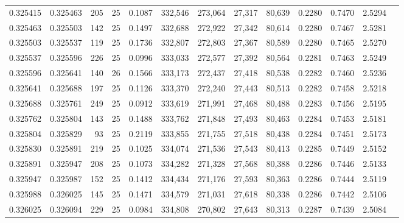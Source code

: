 \begin{tabular}{rrrrrrrrrrrrr}
0.325415 & 0.325463 &   205 &  25 &                                     0.1087 & 332,546 & 273,064 &  27,317 &  80,639 & 0.2280 & 0.7470 & 2.5294 \\
0.325463 & 0.325503 &   142 &  25 &                                     0.1497 & 332,688 & 272,922 &  27,342 &  80,614 & 0.2280 & 0.7467 & 2.5281 \\
0.325503 & 0.325537 &   119 &  25 &                                     0.1736 & 332,807 & 272,803 &  27,367 &  80,589 & 0.2280 & 0.7465 & 2.5270 \\
0.325537 & 0.325596 &   226 &  25 &                                     0.0996 & 333,033 & 272,577 &  27,392 &  80,564 & 0.2281 & 0.7463 & 2.5249 \\
0.325596 & 0.325641 &   140 &  26 &                                     0.1566 & 333,173 & 272,437 &  27,418 &  80,538 & 0.2282 & 0.7460 & 2.5236 \\
0.325641 & 0.325688 &   197 &  25 &                                     0.1126 & 333,370 & 272,240 &  27,443 &  80,513 & 0.2282 & 0.7458 & 2.5218 \\
0.325688 & 0.325761 &   249 &  25 &                                     0.0912 & 333,619 & 271,991 &  27,468 &  80,488 & 0.2283 & 0.7456 & 2.5195 \\
0.325762 & 0.325804 &   143 &  25 &                                     0.1488 & 333,762 & 271,848 &  27,493 &  80,463 & 0.2284 & 0.7453 & 2.5181 \\
0.325804 & 0.325829 &    93 &  25 &                                     0.2119 & 333,855 & 271,755 &  27,518 &  80,438 & 0.2284 & 0.7451 & 2.5173 \\
0.325830 & 0.325891 &   219 &  25 &                                     0.1025 & 334,074 & 271,536 &  27,543 &  80,413 & 0.2285 & 0.7449 & 2.5152 \\
0.325891 & 0.325947 &   208 &  25 &                                     0.1073 & 334,282 & 271,328 &  27,568 &  80,388 & 0.2286 & 0.7446 & 2.5133 \\
0.325947 & 0.325987 &   152 &  25 &                                     0.1412 & 334,434 & 271,176 &  27,593 &  80,363 & 0.2286 & 0.7444 & 2.5119 \\
0.325988 & 0.326025 &   145 &  25 &                                     0.1471 & 334,579 & 271,031 &  27,618 &  80,338 & 0.2286 & 0.7442 & 2.5106 \\
0.326025 & 0.326094 &   229 &  25 &                                     0.0984 & 334,808 & 270,802 &  27,643 &  80,313 & 0.2287 & 0.7439 & 2.5084 \\

\end{tabular}

